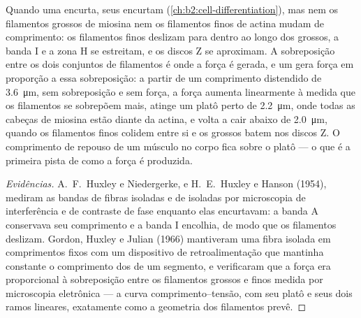 \begin{proposition}\label{prop:b2:muscle-movement:sliding}
Quando uma  encurta, seus  encurtam (\cref{ch:b2:cell-differentiation}),
mas nem os filamentos grossos de miosina nem os filamentos finos de
actina mudam de comprimento: os filamentos finos deslizam para dentro
ao longo dos grossos, a banda I e a zona H se estreitam, e os discos Z se
aproximam. A sobreposição entre os dois conjuntos de filamentos é onde a
força é gerada, e um  gera força em proporção a essa
sobreposição: a partir de um comprimento distendido de
\qty{3.6}{\micro m}, sem sobreposição e sem força, a força aumenta
linearmente à medida que os filamentos se sobrepõem mais, atinge um
platô perto de \qty{2.2}{\micro m}, onde todas as cabeças de miosina
estão diante da actina, e volta a cair abaixo de \qty{2.0}{\micro m},
quando os filamentos finos colidem entre si e os grossos batem nos
discos Z. O comprimento de repouso de um músculo no corpo fica sobre o
platô --- o que é a primeira pista de como a força é produzida.
\end{proposition}
\begin{proof}[Evidências]
A.~F.~Huxley e Niedergerke, e H.~E.~Huxley e Hanson (1954), mediram as
bandas de fibras isoladas e de  isoladas por microscopia de
interferência e de contraste de fase enquanto elas encurtavam: a banda A
conservava seu comprimento e a banda I encolhia, de modo que os
filamentos deslizam. Gordon, Huxley e Julian (1966) mantiveram uma fibra
isolada em comprimentos fixos com um dispositivo de retroalimentação que
mantinha constante o comprimento dos  de um segmento, e
verificaram que a força era proporcional à sobreposição entre os
filamentos grossos e finos medida por microscopia eletrônica --- a curva
comprimento--tensão, com seu platô e seus dois ramos lineares,
exatamente como a geometria dos filamentos prevê.
\end{proof}

